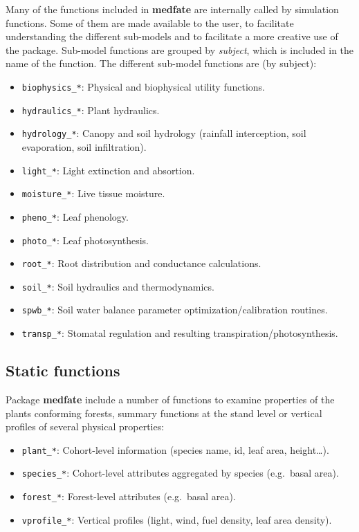 \documentclass[]{book}
\providecommand{\tightlist}{%
  \setlength{\itemsep}{0pt}\setlength{\parskip}{0pt}}
\begin{document}
Many of the functions included in \textbf{medfate} are internally called
by simulation functions. Some of them are made available to the user, to
facilitate understanding the different sub-models and to facilitate a
more creative use of the package. Sub-model functions are grouped by
\emph{subject}, which is included in the name of the function. The
different sub-model functions are (by subject):

\begin{itemize}
\tightlist
\item
  \texttt{biophysics\_*}: Physical and biophysical utility functions.
\item
  \texttt{hydraulics\_*}: Plant hydraulics.
\item
  \texttt{hydrology\_*}: Canopy and soil hydrology (rainfall
  interception, soil evaporation, soil infiltration).
\item
  \texttt{light\_*}: Light extinction and absortion.
\item
  \texttt{moisture\_*}: Live tissue moisture.
\item
  \texttt{pheno\_*}: Leaf phenology.
\item
  \texttt{photo\_*}: Leaf photosynthesis.
\item
  \texttt{root\_*}: Root distribution and conductance calculations.
\item
  \texttt{soil\_*}: Soil hydraulics and thermodynamics.
\item
  \texttt{spwb\_*}: Soil water balance parameter
  optimization/calibration routines.
\item
  \texttt{transp\_*}: Stomatal regulation and resulting
  transpiration/photosynthesis.
\end{itemize}

\subsection{Static functions}\label{static-functions}

Package \textbf{medfate} include a number of functions to examine
properties of the plants conforming forests, summary functions at the
stand level or vertical profiles of several physical properties:

\begin{itemize}
\tightlist
\item
  \texttt{plant\_*}: Cohort-level information (species name, id, leaf
  area, height\ldots{}).
\item
  \texttt{species\_*}: Cohort-level attributes aggregated by species
  (e.g.~basal area).
\item
  \texttt{forest\_*}: Forest-level attributes (e.g.~basal area).
\item
  \texttt{vprofile\_*}: Vertical profiles (light, wind, fuel density,
  leaf area density).
\end{itemize}
\end{document}
